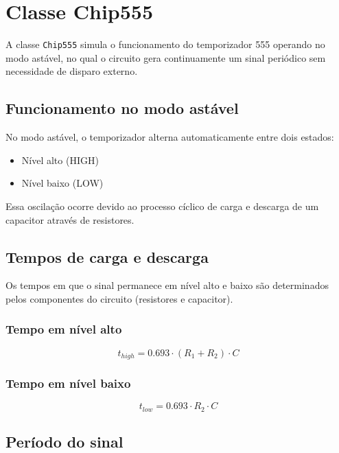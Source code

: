 \documentclass[12pt,a4paper]{article}
\begin{document}
\section{Classe Chip555}

A classe \texttt{Chip555} simula o funcionamento do temporizador 555 operando no modo astável, no qual o circuito gera continuamente um sinal periódico sem necessidade de disparo externo.

\subsection{Funcionamento no modo astável}

No modo astável, o temporizador alterna automaticamente entre dois estados:
\begin{itemize}
    \item Nível alto (HIGH)
    \item Nível baixo (LOW)
\end{itemize}

Essa oscilação ocorre devido ao processo cíclico de carga e descarga de um capacitor através de resistores.

\subsection{Tempos de carga e descarga}

Os tempos em que o sinal permanece em nível alto e baixo são determinados pelos componentes do circuito (resistores e capacitor).

\subsubsection{Tempo em nível alto}

\begin{equation}
t_{high} = 0.693 \cdot (R_1 + R_2) \cdot C
\end{equation}

\subsubsection{Tempo em nível baixo}

\begin{equation}
t_{low} = 0.693 \cdot R_2 \cdot C
\end{equation}

\subsection{Período do sinal}
\end{document}

